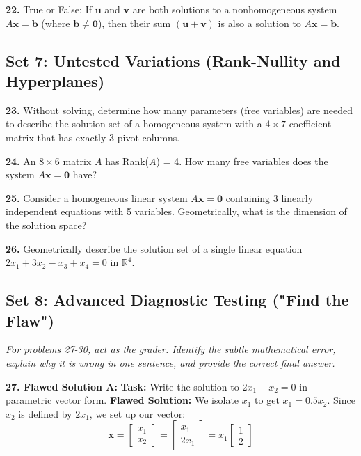 \documentclass[12pt]{article}
\begin{document}
\textbf{22.} True or False: If $\mathbf{u}$ and $\mathbf{v}$ are both solutions to a nonhomogeneous system $A\mathbf{x} = \mathbf{b}$ (where $\mathbf{b} \neq \mathbf{0}$), then their sum $(\mathbf{u} + \mathbf{v})$ is also a solution to $A\mathbf{x} = \mathbf{b}$.

\subsection*{Set 7: Untested Variations (Rank-Nullity and Hyperplanes)}
\textbf{23.} Without solving, determine how many parameters (free variables) are needed to describe the solution set of a homogeneous system with a $4 \times 7$ coefficient matrix that has exactly 3 pivot columns.

\textbf{24.} An $8 \times 6$ matrix $A$ has Rank($A$) = 4. How many free variables does the system $A\mathbf{x} = \mathbf{0}$ have?

\textbf{25.} Consider a homogeneous linear system $A\mathbf{x} = \mathbf{0}$ containing 3 linearly independent equations with 5 variables. Geometrically, what is the dimension of the solution space?

\textbf{26.} Geometrically describe the solution set of a single linear equation $2x_1 + 3x_2 - x_3 + x_4 = 0$ in $\mathbb{R}^4$. 

\subsection*{Set 8: Advanced Diagnostic Testing ("Find the Flaw")}
\textit{For problems 27-30, act as the grader. Identify the subtle mathematical error, explain why it is wrong in one sentence, and provide the correct final answer.}

\textbf{27. Flawed Solution A:}
\textbf{Task:} Write the solution to $2x_1 - x_2 = 0$ in parametric vector form.
\textbf{Flawed Solution:} We isolate $x_1$ to get $x_1 = 0.5x_2$. Since $x_2$ is defined by $2x_1$, we set up our vector:
$$ \mathbf{x} = \begin{bmatrix} x_1 \\ x_2 \end{bmatrix} = \begin{bmatrix} x_1 \\ 2x_1 \end{bmatrix} = x_1 \begin{bmatrix} 1 \\ 2 \end{bmatrix} $$
\end{document}
